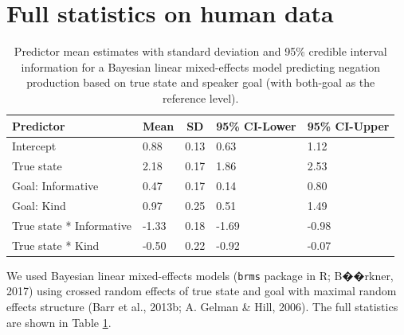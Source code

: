 \documentclass[oneside]{report}
\begin{document}
\section{Full statistics on human
data}\label{full-statistics-on-human-data}
\begin{table}[tbp]
\begin{center}
\begin{threeparttable}
\caption{\label{tab:brmTab}Predictor mean estimates with standard deviation and 95\% credible interval information for a Bayesian linear mixed-effects model predicting negation production based on true state and speaker goal (with both-goal as the reference level).}
\begin{tabular}{lllll}
\toprule
Predictor & \multicolumn{1}{c}{Mean} & \multicolumn{1}{c}{SD} & \multicolumn{1}{c}{95\% CI-Lower} & \multicolumn{1}{c}{95\% CI-Upper}\\
\midrule
Intercept & 0.88 & 0.13 & 0.63 & 1.12\\
True state & 2.18 & 0.17 & 1.86 & 2.53\\
Goal: Informative & 0.47 & 0.17 & 0.14 & 0.80\\
Goal: Kind & 0.97 & 0.25 & 0.51 & 1.49\\
True state * Informative & -1.33 & 0.18 & -1.69 & -0.98\\
True state * Kind & -0.50 & 0.22 & -0.92 & -0.07\\
\bottomrule
\end{tabular}
\end{threeparttable}
\end{center}
\end{table}
We used Bayesian linear mixed-effects models (\texttt{brms} package in
R; B��rkner, 2017) using crossed random effects of true state and goal
with maximal random effects structure (Barr et al., 2013b; A. Gelman \&
Hill, 2006). The full statistics are shown in Table \ref{tab:brmTab}.
\end{document}
